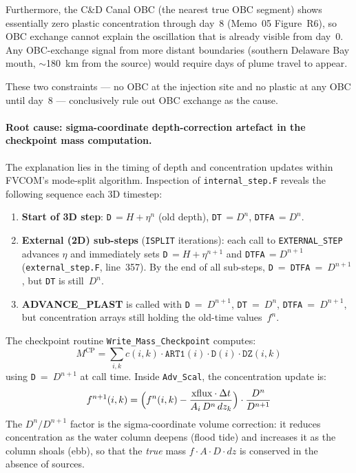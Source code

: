 \documentclass[11pt]{article}
\begin{document}
Furthermore, the C\&D Canal OBC (the nearest true OBC segment) shows
essentially zero plastic concentration through day~8 (Memo~05 Figure~R6),
so OBC exchange cannot explain the oscillation that is already visible
from day~0.  Any OBC-exchange signal from more distant boundaries (southern
Delaware Bay mouth, $\sim$180~km from the source) would require days of
plume travel to appear.

These two constraints --- no OBC at the injection site and no plastic at
any OBC until day~8 --- conclusively rule out OBC exchange as the cause.

\paragraph{Root cause: sigma-coordinate depth-correction artefact in
the checkpoint mass computation.}

The explanation lies in the timing of depth and concentration updates
within FVCOM's mode-split algorithm.  Inspection of
\texttt{internal\_step.F} reveals the following sequence each
3D timestep:
\begin{enumerate}
  \item \textbf{Start of 3D step}: \texttt{D}$\,= H + \eta^n$ (old depth),
        \texttt{DT}$\,= D^n$, \texttt{DTFA}$\,= D^n$.
  \item \textbf{External (2D) sub-steps} (\texttt{ISPLIT} iterations):
        each call to \texttt{EXTERNAL\_STEP} advances $\eta$ and
        immediately sets \texttt{D}$\,= H + \eta^{n+1}$ and
        \texttt{DTFA}$\,= D^{n+1}$ (\texttt{external\_step.F}, line~357).
        By the end of all sub-steps, \texttt{D}~=~\texttt{DTFA}~=~$D^{n+1}$,
        but \texttt{DT} is still~$D^n$.
  \item \textbf{ADVANCE\_PLAST} is called with
        \texttt{D}~=~$D^{n+1}$, \texttt{DT}~=~$D^n$,
        \texttt{DTFA}~=~$D^{n+1}$, but concentration arrays still holding
        the old-time values~$f^n$.
\end{enumerate}

The checkpoint routine \texttt{Write\_Mass\_Checkpoint} computes:
\[
  M^{\text{CP}} = \sum_{i,k} c(i,k)\cdot \texttt{ART1}(i)\cdot \texttt{D}(i)\cdot \texttt{DZ}(i,k)
\]
using \texttt{D}~=~$D^{n+1}$ at call time.  Inside \texttt{Adv\_Scal},
the concentration update is:
\[
  f^{n+1}(i,k) = \Bigl(f^n(i,k) - \frac{\text{xflux}\cdot\Delta t}{A_i\,D^n\,dz_k}\Bigr)
                 \cdot \frac{D^n}{D^{n+1}}
\]
The $D^n/D^{n+1}$ factor is the sigma-coordinate volume correction:
it reduces concentration as the water column deepens (flood tide) and
increases it as the column shoals (ebb), so that the \emph{true} mass
$f\cdot A\cdot D\cdot dz$ is conserved in the absence of sources.
\end{document}
